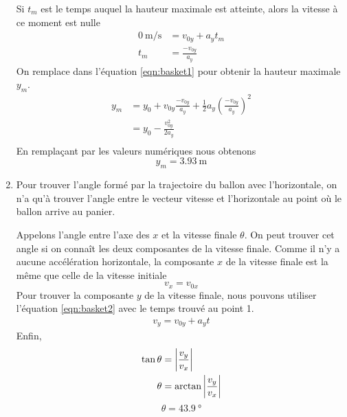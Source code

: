 \begin{enumerate}
    Si $t_m$ est le temps auquel la hauteur maximale est atteinte, alors la
    vitesse à ce moment est nulle
    \begin{align*}
      \SI{0}{\meter\per\second} &= v_{0y} + a_y t_m \\
      t_m &= \frac{-v_{0y}}{a_y} 
    \end{align*}
    On remplace dans l'équation \ref{eqn:basket1} pour obtenir la hauteur
    maximale $y_m$.
    \begin{align*}
      y_m &= y_0 + v_{0y} \frac{-v_{0y}}{a_y} + \frac{1}{2}
             a_y \left(\frac{-v_{0y}}{a_y}\right)^2 \\
          &= y_0 - \frac{v_{0y}^2}{2a_y} \\
    \end{align*}
    En remplaçant par les valeurs numériques nous obtenons
    \[
      \boxed{y_m = \SI{3.93}{\meter}}
    \]

  \item Pour trouver l'angle formé par la trajectoire du ballon avec
    l'horizontale, on n'a qu'à trouver l'angle entre le vecteur vitesse et
    l'horizontale au point où le ballon arrive au panier.

    \begin{marginfigure}
    \end{marginfigure}

    Appelons l'angle entre l'axe des $x$ et la vitesse finale $\theta$.  On
    peut trouver cet angle si on connaît les deux composantes de la vitesse
    finale.  Comme il n'y a aucune accélération horizontale, la composante $x$
    de la vitesse finale est la même que celle de la vitesse initiale
    \[
      v_x = v_{0x}
    \]
    Pour trouver la composante $y$ de la vitesse finale, nous pouvons utiliser
    l'équation \ref{eqn:basket2} avec le temps trouvé au point 1.
    \begin{align*}
      v_y = v_{0y} + a_yt
    \end{align*}
    Enfin,
    \begin{align*}
      \tan \theta &= \left| \frac{v_y}{v_x} \right| \\
      \theta &= \arctan\left| \frac{v_y}{v_x} \right|
    \end{align*}
    \[
      \boxed{\theta = \SI{43.9}{\degree}}
    \]

\end{enumerate}



